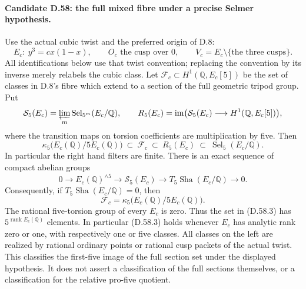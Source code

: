 \paragraph{Candidate D.58: the full mixed fibre under a precise Selmer hypothesis.}

Use the actual cubic twist and the preferred origin of D.8:
\[
 E_c:\ y^3=cx(1-x),\qquad O_c\text{ the cusp over }0,
 \qquad V_c=E_c\setminus\{\text{the three cusps}\}.
\]
All identifications below use that twist convention; replacing the
convention by its inverse merely relabels the cubic class.  Let
$\mathcal F_c\subset H^1(\mathbb Q,E_c[5])$ be the set of
classes in D.8's fibre which extend to a section of the full
geometric tripod group.  Put
\[
 \mathcal S_5(E_c)=\varprojlim_m\operatorname{Sel}_{5^m}(E_c/\mathbb Q),
 \qquad
 R_5(E_c)=\operatorname{im}\bigl(\mathcal S_5(E_c)
                  \longrightarrow H^1(\mathbb Q,E_c[5])\bigr),
\]
where the transition maps on torsion coefficients are multiplication
by five.  Then
\[
 \kappa_5\bigl(E_c(\mathbb Q)/5E_c(\mathbb Q)\bigr)
       \ \subset\ \mathcal F_c\ \subset\ R_5(E_c)
       \ \subset\ \operatorname{Sel}_5(E_c/\mathbb Q).       \tag{D.58.1}
\]
In particular the right hand filters are finite.  There is an exact
sequence of compact abelian groups
\[
 0\longrightarrow E_c(\mathbb Q)^{\wedge 5}
 \longrightarrow\mathcal S_5(E_c)
 \longrightarrow T_5\operatorname{Sha}(E_c/\mathbb Q)\longrightarrow0.  \tag{D.58.2}
\]
Consequently, if $T_5\operatorname{Sha}(E_c/\mathbb Q)=0$, then
\[
 \mathcal F_c=
 \kappa_5\bigl(E_c(\mathbb Q)/5E_c(\mathbb Q)\bigr).       \tag{D.58.3}
\]
The rational five-torsion group of every $E_c$ is zero.  Thus the
set in (D.58.3) has $5^{\operatorname{rank}E_c(\mathbb Q)}$
elements.  In particular (D.58.3) holds whenever $E_c$ has
analytic rank zero or one, with respectively one or five classes.
All classes on the left are realized by rational ordinary points
or rational cusp packets of the actual twist.  This classifies
the first-five image of the full section set under the displayed
hypothesis.  It does not assert a classification of the full
sections themselves, or a classification for the relative
pro-five quotient.

